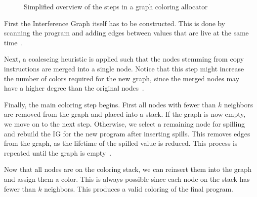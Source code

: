 \begin{figure}
\centering
{}
\caption{Simplified overview of the steps in a graph coloring allocator~\cite{hack-thesis}}
\label{fig:graph-coloring-steps}
\end{figure}
First the Interference Graph itself has to be constructed. This is done by scanning the program and adding edges between values that are live at the same time~\cite{chaitin1981}. 

Next, a coalescing heuristic is applied such that the nodes stemming from copy instructions are merged into a single node. Notice that this step might increase the number of colors required for the new graph, since the merged nodes may have a higher degree than the original nodes~\cite{chaitin1981}.

Finally, the main coloring step begins. First all nodes with fewer than $k$ neighbors are removed from the graph and placed into a stack. If the graph is now empty, we move on to the next step. Otherwise, we select a remaining node for spilling and rebuild the IG for the new program after inserting spills. This removes edges from the graph, as the lifetime of the spilled value is reduced. This process is repeated until the graph is empty~\cite{chaitin1981}.

Now that all nodes are on the coloring stack, we can reinsert them into the graph and assign them a color. This is always possible since each node on the stack has fewer than $k$ neighbors. This produces a valid coloring of the final program.


